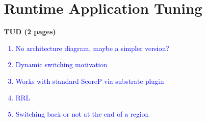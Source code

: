 \section{Runtime Application Tuning} \label{rat}
\textbf{TUD (2 pages)}

\textcolor{blue}{\begin{enumerate}
  \item No architecture diagram, maybe a simpler version?
  \item Dynamic switching motivation
  \item Works with standard ScoreP via substrate plugin
  \item RRL
  \item Switching back or not at the end of a region
\end{enumerate}
}